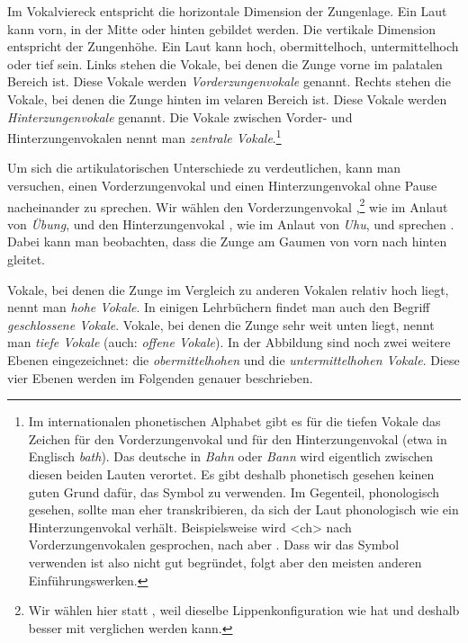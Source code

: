 Im Vokalviereck entspricht die horizontale Dimension der Zungenlage. Ein Laut kann vorn, in der Mitte oder hinten gebildet werden. Die vertikale Dimension entspricht der Zungenhöhe. Ein Laut kann hoch, obermittelhoch, untermittelhoch oder tief sein. Links stehen die Vokale, bei denen die Zunge vorne im palatalen Bereich ist. Diese Vokale werden \textit{Vorderzungenvokale} genannt. Rechts stehen die Vokale, bei denen die Zunge hinten im velaren Bereich ist. Diese Vokale werden \textit{Hinterzungenvokale} genannt. Die Vokale zwischen Vorder- und Hinterzungenvokalen nennt man \textit{zentrale Vokale}.\footnote{Im internationalen phonetischen Alphabet gibt es für die tiefen Vokale das Zeichen \textipa{[a]} für den Vorderzungenvokal und \textipa{[A]} für den Hinterzungenvokal (etwa in Englisch \textit{bath}). Das deutsche \textipa{[a]} in \textit{Bahn} oder \textit{Bann} wird eigentlich zwischen diesen beiden Lauten verortet. Es gibt deshalb phonetisch gesehen keinen guten Grund dafür, das Symbol \textipa{[a]} zu verwenden. Im Gegenteil, phonologisch gesehen, sollte man eher \textipa{[A]} transkribieren, da sich der Laut phonologisch wie ein Hinterzungenvokal verhält. Beispielsweise wird <ch> nach Vorderzungenvokalen \textipa{[\c{c}]} gesprochen, nach \textipa{[a]} aber \textipa{[\textchi ]} \citep[14]{Becker1998}. Dass wir das Symbol \textipa{[a]} verwenden ist also nicht gut begründet, folgt aber den meisten anderen Einführungswerken.}

Um sich die artikulatorischen Unterschiede zu verdeutlichen, kann man versuchen, einen Vorderzungenvokal und einen Hinterzungenvokal ohne Pause nacheinander zu sprechen. Wir wählen den Vorderzungenvokal \textipa{[y]},\footnote{Wir wählen hier \textipa{[y]} statt \textipa{[i]}, weil \textipa{[y]} dieselbe Lippenkonfiguration wie \textipa{[u]} hat und deshalb besser mit \textipa{[u]} verglichen werden kann.} wie im Anlaut von \textit{Übung}, und den Hinterzungenvokal \textipa{[u]}, wie im Anlaut von \textit{Uhu}, und sprechen \textipa{[yyyuuu]}. Dabei kann man beobachten, dass die Zunge am Gaumen von vorn nach hinten gleitet.

Vokale, bei denen die Zunge im Vergleich zu anderen Vokalen relativ hoch liegt, nennt man \textit{hohe Vokale}. In einigen Lehrbüchern findet man auch den Begriff \textit{geschlossene Vokale}. Vokale, bei denen die Zunge sehr weit unten liegt, nennt man \textit{tiefe Vokale} (auch: \textit{offene Vokale}). In der Abbildung sind noch zwei weitere Ebenen eingezeichnet: die \textit{obermittelhohen} und die \textit{untermittelhohen Vokale}. Diese vier Ebenen werden im Folgenden genauer beschrieben.


